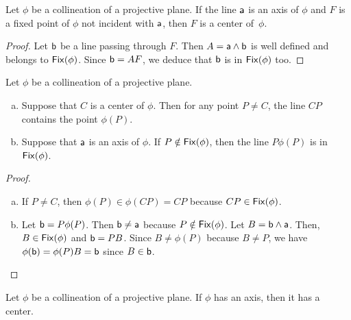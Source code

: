 \begin{lem}\label{lem:fixed-not-axis-is-center}
    Let\/ $\phi$ be a collineation of a projective plane. If the line\/ $\mathsf a$ is an axis of\/ $\phi$ and\/ $F$ is a fixed point of\/ $\phi$ not incident with\/ $\mathsf a$, then\/ $F$ is a center of\/~$\phi$.
\end{lem}

\begin{proof}
    Let $\mathsf b$ be a line passing through $F$. Then $A=\mathsf a\wedge\mathsf b$ is well defined and belongs to $\operatorname{\mathsf{Fix}}(\phi)$. Since $\mathsf b=AF$, we deduce that $\mathsf b$ is in $\operatorname{\mathsf{Fix}}(\phi)$ too.
\end{proof}

\begin{lem}\label{lem:P-and-phi(P)}
    Let\/ $\phi$ be a collineation of a projective plane.
    \begin{enumerate}[a),font=\upshape]
        \item Suppose that\/ $C$ is a center of\/ $\phi$. Then for any point\/ $P \ne C$, the line\/ $CP$ contains the point\/ $\phi(P)$.
        \item Suppose that\/ $\mathsf a$ is an axis of\/ $\phi$. If\/ $P\notin\operatorname{\mathsf{Fix}}(\phi)$, then the line\/ $P\phi(P)$ is in\/ $\operatorname{\mathsf{Fix}}(\phi)$.
    \end{enumerate}
\end{lem}

\begin{proof}${}$
    \begin{enumerate}[a)]
        \item If $P\ne C$, then $\phi(P)\in\phi(CP)=CP$ because $CP\in\operatorname{\mathsf{Fix}}(\phi)$.

        \item Let $\mathsf b=P\phi(P)$. Then $\mathsf b\ne\mathsf a$ because $P\notin\operatorname{\mathsf{Fix}}(\phi)$. Let $B=\mathsf b\wedge\mathsf a$. Then, $B\in\operatorname{\mathsf{Fix}}(\phi)$ and $\mathsf b=PB$. Since $B\ne\phi(P)$ because $B\ne P$, we have $\phi(\mathsf b)=\phi(P)B=\mathsf b$ since $B\in\mathsf b$. %
    \end{enumerate}
    
\end{proof}

\begin{thm}\label{thm:axis-iff-center}
    Let\/ $\phi$ be a collineation of a projective plane. If\/ $\phi$ has an axis, then it has a center.
\end{thm}

